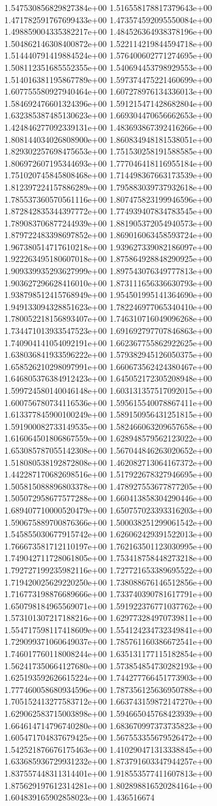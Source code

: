 1.547530856829827384e+00	1.516558178817379643e+00	1.471782591767699433e+00	1.473574592095550084e+00	1.498859004335382217e+00	1.484526364938378196e+00	1.504862146308400872e+00	1.522114219844594718e+00	1.514440791419884524e+00	1.576400602771274695e+00	1.508112351685552355e+00	1.540694453798929553e+00	1.514016381195867789e+00	1.597374475221460699e+00	1.607755580927940464e+00	1.607278976134336013e+00	1.584692476601324396e+00	1.591215471428682804e+00	1.632385387485130623e+00	1.669304470656662653e+00	1.424846277092339131e+00	1.483693867392416266e+00	1.808144034026808900e+00	1.860834948181538051e+00	1.829302257698475653e+00	1.751530258191588585e+00	1.806972607195344693e+00	1.777046418116955184e+00	1.751020745845808468e+00	1.714498367663173539e+00	1.812397224157886289e+00	1.795883039737932618e+00	1.785537360570561116e+00	1.807475823199946596e+00	1.872842835344397772e+00	1.774939407834783545e+00	1.789083706877244939e+00	1.881905372054940573e+00	1.879722483398697852e+00	1.869016063458593724e+00	1.967380514717610218e+00	1.939627339082186097e+00	1.922263495180607018e+00	1.875864928848290925e+00	1.909339935293627999e+00	1.897543076349777813e+00	1.903627296628416010e+00	1.873111656336630793e+00	1.938798512415768949e+00	1.954501995141364690e+00	1.949133094328851623e+00	1.782246977065340410e+00	1.780052218156893407e+00	1.746310716049096268e+00	1.734471013933547523e+00	1.691692797707846863e+00	1.740904141054092191e+00	1.662367755862922625e+00	1.638036841933596222e+00	1.579382945126050375e+00	1.658526210298097991e+00	1.660673562424380467e+00	1.646805376384912423e+00	1.645052172305208948e+00	1.599724580140046148e+00	1.603131357517092015e+00	1.600756780734116536e+00	1.595615540078867411e+00	1.613377845900100249e+00	1.589150956431251815e+00	1.591900082733149535e+00	1.582466063209657658e+00	1.616064501806867559e+00	1.628948579562123022e+00	1.653085787055142308e+00	1.567044846263020652e+00	1.518080538192872808e+00	1.462082713064167372e+00	1.442287170682698516e+00	1.517922678327946695e+00	1.505815088896803378e+00	1.478927553677877205e+00	1.505072958677577288e+00	1.660413858304290446e+00	1.689407710000520479e+00	1.650757023393316203e+00	1.590675889700876366e+00	1.500038251299061542e+00	1.545855030677915742e+00	1.626062429391522013e+00	1.766673581712110197e+00	1.762163501123030995e+00	1.749042711728061805e+00	1.753418758448273218e+00	1.792727199235982116e+00	1.727721653389695522e+00	1.719420025629220250e+00	1.738088676146512856e+00	1.716773198876689666e+00	1.733740390781617791e+00	1.650798184965569071e+00	1.591922376771037762e+00	1.573101307217188216e+00	1.629773284970739811e+00	1.554717598117418609e+00	1.554124234732349841e+00	1.729099371060649037e+00	1.785761160386672541e+00	1.746017760118008244e+00	1.635131177115182854e+00	1.562417350664127680e+00	1.573854854730282193e+00	1.625193592626615224e+00	1.744277766451773903e+00	1.777460058680934596e+00	1.787356125636950788e+00	1.705152413277583712e+00	1.663743159872147270e+00	1.629062583715003898e+00	1.594665045768423939e+00	1.664614714796740280e+00	1.683670997373735823e+00	1.605471704837679425e+00	1.567553355679526472e+00	1.542521876676175463e+00	1.410290471313338845e+00	1.633685936729931232e+00	1.873791603347944257e+00	1.837557448311314401e+00	1.918553577411607813e+00	1.875629197612314281e+00	1.802898816520284164e+00	1.604839165902858023e+00	1.436516674
